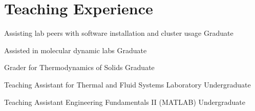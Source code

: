 \section{Teaching Experience}

Assisting lab peers with software installation and cluster usage \hfill Graduate

Assisted in molecular dynamic labs \hfill Graduate

Grader for Thermodynamics of Solids \hfill Graduate
 
Teaching Assistant for Thermal and Fluid Systems Laboratory \hfill Undergraduate

Teaching Assistant Engineering Fundamentals II (MATLAB) \hfill Undergraduate